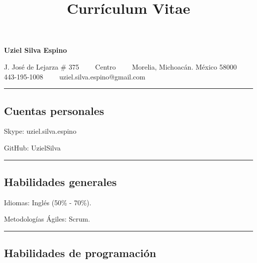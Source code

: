\documentclass[10pt,letterpaper]{article}
\title{Currículum Vitae}
\newenvironment{indentsection}[1]%
{\begin{list}{}%
	{\setlength{\leftmargin}{#1}}%
	\item[]%
}
{\end{list}}
\begin{document}
\begin{center}
{\LARGE \textbf{Uziel Silva Espino}}

J. José de Lejarza \# 375\ \ \textbullet
\ \ Centro\ \ \textbullet
\ \ Morelia, Michoacán. México 58000
\\
443-195-1008\ \ \textbullet
\ \ uziel.silva.espino@gmail.com
\end{center}

\hrule
\vspace{-0.9em}
\subsection*{Cuentas personales}

\begin{indentsection}{\parindent}
\begin{description*}
	\item[Skype:]
	uziel.silva.espino
	\item[GitHub:]
	UzielSilva
	
\end{description*}
\end{indentsection}

\hrule
\vspace{-0.4em}
\subsection*{Habilidades generales}

\begin{indentsection}{\parindent}
\begin{description*}
	\item[Idiomas:] 
    Inglés (50\% - 70\%).
    
    \item[Metodologías Ágiles:]
    Scrum.
	
\end{description*}
\end{indentsection}

\hrule
\vspace{-0.4em}
\subsection*{Habilidades de programación}
\end{document}
